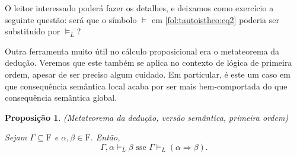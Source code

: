 \documentclass{report}
\newtheorem{prop}{Proposição}
\theoremstyle{definition}
\theoremstyle{remark}
\newcommand{\F}{\mathrm{F}}
\newcommand{\imply}{\mathbin{\Rightarrow}}
\begin{document}
	O leitor interessado poderá fazer os detalhes, e deixamos como exercício a seguinte questão: será que o símbolo $\vDash$ em \eqref{fol:tautoistheo:eq2} poderia ser substituído por $\vDash_L$?
	
	\smallskip
	
	Outra ferramenta muito útil no cálculo proposicional era o metateorema da dedução. Veremos que este também se aplica no contexto de lógica de primeira ordem, apesar de ser preciso algum cuidado. Em particular, é este um caso em que consequência semântica local acaba por ser mais bem-comportada do que consequência semântica global.
	
	\begin{prop}(Metateorema da dedução, versão semântica, primeira ordem)
	
	Sejam $\Gamma \subseteq \F$ e $\alpha, \beta \in \F$. Então,
	\[\Gamma, \alpha \vDash_L \beta \text{ sse } \Gamma \vDash_L (\alpha \imply \beta).\]
	\end{prop}
	
\end{document}
